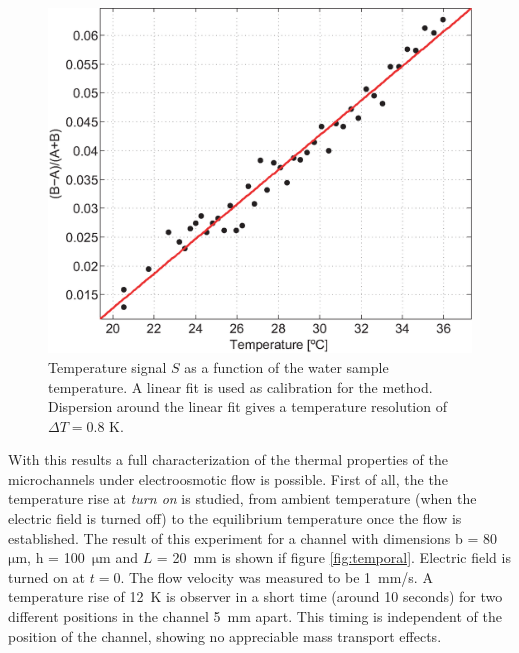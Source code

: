 \documentclass[twocolumn]{svjour3}       %
\begin{document}
\begin{figure}[h!]
\centering
\includegraphics[width=\columnwidth]{figs/calib.eps}
\caption{Temperature signal $S$ as a function of the water sample temperature. A linear fit is used as calibration for the method. Dispersion around the linear fit gives a temperature resolution of $\Delta T = 0.8$ K.\label{fig:calib}}
\end{figure}

With this results a full characterization of the thermal properties of the microchannels under electroosmotic flow is possible. First of all, the the temperature rise at \textit{turn on} is studied, from ambient temperature (when the electric field is turned off) to the equilibrium temperature once the flow is established. The result of this experiment for a channel with dimensions b = 80~$\mathrm{\mu m}$, h = 100~$\mathrm{\mu m}$ and $L$ = 20~mm is shown if figure \ref{fig:temporal}. Electric field is turned on at $t = 0$. The flow velocity was measured to be 1~mm/s. A temperature rise of 12~K is observer in a short time (around 10 seconds) for two different positions in the channel 5~mm apart. This timing is independent of the position of the channel, showing no appreciable mass transport effects.
\end{document}
